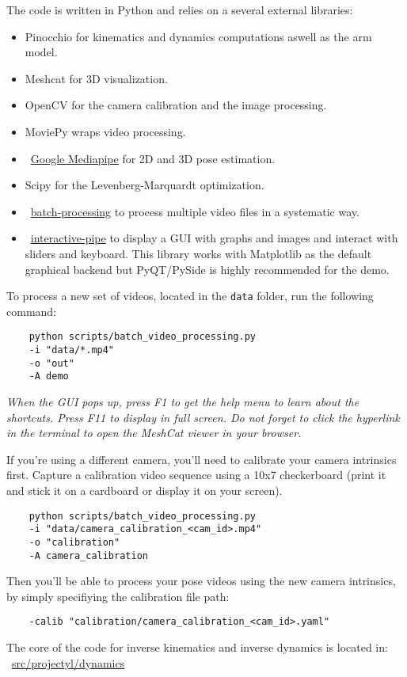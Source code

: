 The code is written in Python and relies on a several external libraries:
\begin{itemize}
    \item Pinocchio for kinematics and dynamics computations aswell as the arm model.
    \item Meshcat for 3D visualization.
    \item OpenCV for the camera calibration and the image processing.
    \item MoviePy wraps video processing.
    \item ~\href{https://developers.google.com/mediapipe}{Google Mediapipe} for 2D and  3D pose estimation.
    \item Scipy for the Levenberg-Marquardt optimization.
    \item ~\href{https://github.com/emmcb/batch-processing}{batch-processing} to process multiple video files in a systematic way.
    \item ~\href{https://github.com/balthazarneveu/interactive_pipe}{interactive-pipe} to display a GUI with graphs and images and interact with sliders and keyboard.
    This library works with Matplotlib as the default graphical backend but PyQT/PySide is highly recommended for the demo.
\end{itemize}

To process a new set of videos, located in the \texttt{data} folder, run the following command:
\begin{verbatim}
    python scripts/batch_video_processing.py
    -i "data/*.mp4"
    -o "out"
    -A demo
\end{verbatim}
\textit{When the GUI pops up, press F1 to get the help menu to learn about the shortcuts. Press F11 to display in full screen.
Do not forget to click the hyperlink in the terminal to open the MeshCat viewer in your browser.}


If you're using a different camera, you'll need to calibrate your camera intrinsics first.
Capture a calibration video sequence using a 10x7 checkerboard (print it and stick it on a cardboard or display it on your screen).

\begin{verbatim}
    python scripts/batch_video_processing.py
    -i "data/camera_calibration_<cam_id>.mp4"
    -o "calibration"
    -A camera_calibration
\end{verbatim}

Then you'll be able to process your pose videos using the new camera intrinsics, by simply specifiying
the calibration file path:
\begin{verbatim}
    -calib "calibration/camera_calibration_<cam_id>.yaml"
\end{verbatim}

The core of the code for inverse kinematics and inverse dynamics is located in:
~\href{https://github.com/balthazarneveu/monocular_pose_and_forces_estimation/tree/main/src/projectyl/dynamics}{src/projectyl/dynamics}